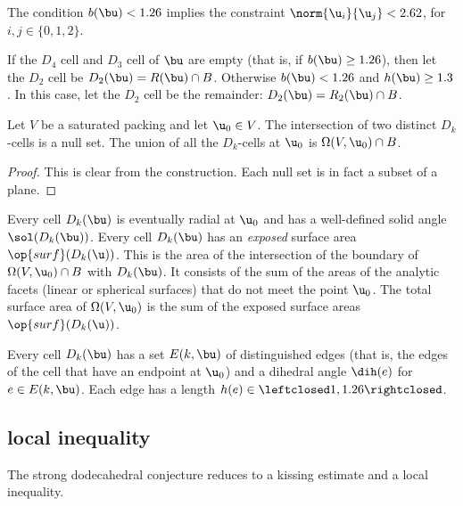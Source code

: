 The condition $b(\bu)< 1.26$ implies the constraint $\norm{ \u_i}{ \u_j}<
2.62$, for $i,j\in\{0,1,2\}$.

\begin{definition}[$D_2$]
If the $D_4$ cell and $D_3$ cell of $\bu$ are empty (that is, if $b(\bu)\ge 1.26$), then
let the $D_2$ cell be $D_2(\bu)=R(\bu)\cap B$.  Otherwise $b(\bu)< 1.26$ and $h(\bu) \ge 1.3$.
In this case, let the $D_2$ cell be the remainder: $D_2(\bu)=R_2(\bu)\cap B$.
\end{definition}

\begin{lemma}[]
Let $V$ be a saturated packing and let $\u_0\in V$.
 The intersection of two distinct $D_k$-cells is a null set.  The union
  of all the $D_k$-cells at $\u_0$ is $\Omega(V, \u_0)\cap B$.
\end{lemma}
%

\begin{proof} This is clear from the construction.  Each null set is in fact a subset of a plane.
\end{proof}

Every cell $D_k(\bu)$ is eventually radial at $ \u_0$ and has
a well-defined solid angle $\sol(D_k(\bu))$.
Every cell $D_k(\bu)$ has an {\it exposed} surface area $\op{surf}(D_k(\u))$.
This is the area of the intersection of the boundary of 
$\Omega(V, \u_0)\cap B$ with $D_k(\bu)$.  It consists of the sum of the
areas of the analytic facets (linear or spherical surfaces) that do not meet the point $ \u_0$.
The total surface area of $\Omega(V,\u_0)$ is the sum of the exposed surface
areas $\op{surf}(D_k(\u))$.
%
%
%
%


Every cell $D_k(\bu)$ has a set $E(k,\bu)$ of distinguished edges (that is, the edges of the
cell that have an endpoint at $\u_0$)  and a
dihedral angle $\dih(e)$ for $e\in E(k,\bu)$.  Each edge has a length
$h(e)\in\leftclosed1,1.26\rightclosed$.  %
%
%
%

\subsection{local inequality}

The strong dodecahedral conjecture reduces to a kissing estimate and a local inequality.
%


